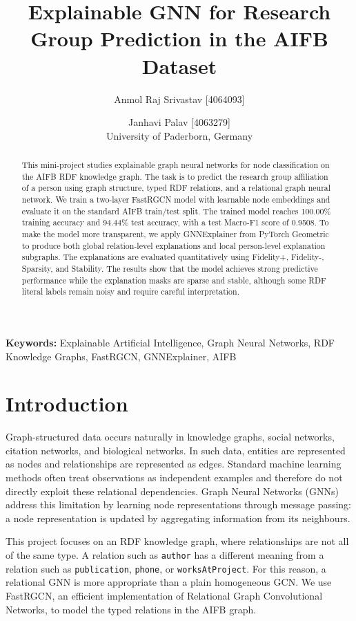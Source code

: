 \documentclass[10pt,a4paper]{article}
\title{\textbf{Explainable GNN for Research Group Prediction in the AIFB Dataset}}
\author{
Anmol Raj Srivastav [4064093] \and
Janhavi Palav [4063279] \\
University of Paderborn, Germany
}
\date{}
\begin{document}
\maketitle

\begin{abstract}
This mini-project studies explainable graph neural networks for node
classification on the AIFB RDF knowledge graph. The task is to predict the
research group affiliation of a person using graph structure, typed RDF
relations, and a relational graph neural network. We train a two-layer
FastRGCN model with learnable node embeddings and evaluate it on the standard
AIFB train/test split. The trained model reaches 100.00\% training accuracy and
94.44\% test accuracy, with a test Macro-F1 score of 0.9508. To make the model
more transparent, we apply GNNExplainer from PyTorch Geometric to produce both
global relation-level explanations and local person-level explanation
subgraphs. The explanations are evaluated quantitatively using Fidelity+,
Fidelity-, Sparsity, and Stability. The results show that the model achieves
strong predictive performance while the explanation masks are sparse and
stable, although some RDF literal labels remain noisy and require careful
interpretation.
\end{abstract}

\noindent\textbf{Keywords:} Explainable Artificial Intelligence, Graph Neural
Networks, RDF Knowledge Graphs, FastRGCN, GNNExplainer, AIFB

\section{Introduction}
Graph-structured data occurs naturally in knowledge graphs, social networks,
citation networks, and biological networks. In such data, entities are
represented as nodes and relationships are represented as edges. Standard
machine learning methods often treat observations as independent examples and
therefore do not directly exploit these relational dependencies. Graph Neural
Networks (GNNs) address this limitation by learning node representations through
message passing: a node representation is updated by aggregating information
from its neighbours.

This project focuses on an RDF knowledge graph, where relationships are not all
of the same type. A relation such as \texttt{author} has a different meaning
from a relation such as \texttt{publication}, \texttt{phone}, or
\texttt{worksAtProject}. For this reason, a relational GNN is more appropriate
than a plain homogeneous GCN. We use FastRGCN, an efficient implementation of
Relational Graph Convolutional Networks, to model the typed relations in the
AIFB graph.
\end{document}
